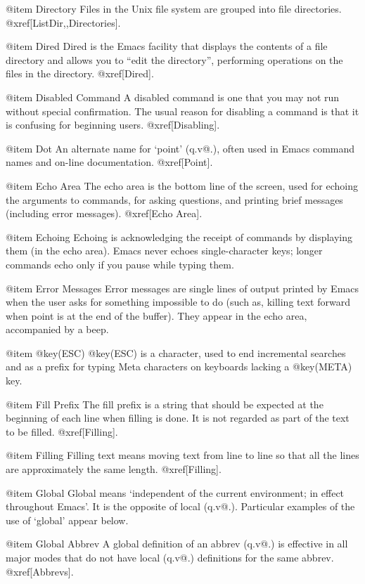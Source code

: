 @item Directory
Files in the Unix file system are grouped into file directories.
@xref[ListDir,,Directories].

@item Dired
Dired is the Emacs facility that displays the contents of a file
directory and allows you to ``edit the directory'', performing
operations on the files in the directory.  @xref[Dired].

@item Disabled Command
A disabled command is one that you may not run without special
confirmation.  The usual reason for disabling a command is that it is
confusing for beginning users.  @xref[Disabling].

@item Dot
An alternate name for `point' (q.v@.), often used in Emacs command names
and on-line documentation.  @xref[Point].

@item Echo Area
The echo area is the bottom line of the screen, used for echoing the
arguments to commands, for asking questions, and printing brief messages
(including error messages).  @xref[Echo Area].

@item Echoing
Echoing is acknowledging the receipt of commands by displaying them
(in the echo area).  Emacs never echoes single-character keys;
longer commands echo only if you pause while typing them.

@item Error Messages
Error messages are single lines of output printed by Emacs when
the user asks for something impossible to do (such as, killing text
forward when point is at the end of the buffer).  They appear
in the echo area, accompanied by a beep.

@item @key(ESC)
@key(ESC) is a character, used to end incremental searches and as a prefix
for typing Meta characters on keyboards lacking a @key(META) key.

@item Fill Prefix
The fill prefix is a string that should be expected at the beginning
of each line when filling is done.  It is not regarded as part of the
text to be filled.  @xref[Filling].

@item Filling
Filling text means moving text from line to line so that all the lines
are approximately the same length.  @xref[Filling].

@item Global
Global means `independent of the current environment; in effect
throughout Emacs'.  It is the opposite of local (q.v@.).  Particular
examples of the use of `global' appear below.

@item Global Abbrev
A global definition of an abbrev (q.v@.) is effective in all major modes
that do not have local (q.v@.) definitions for the same abbrev.
@xref[Abbrevs].

